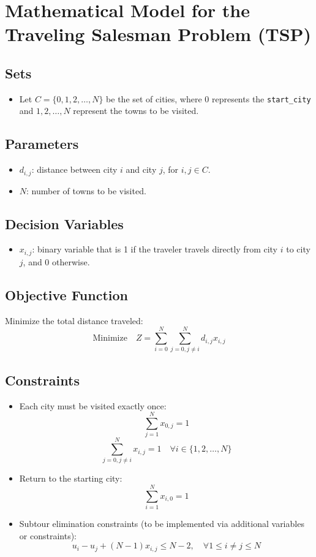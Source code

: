 \documentclass{article}
\begin{document}
\section*{Mathematical Model for the Traveling Salesman Problem (TSP)}

\subsection*{Sets}
\begin{itemize}
    \item Let \( C = \{0, 1, 2, \ldots, N\} \) be the set of cities, where \( 0 \) represents the \texttt{start\_city} and \( 1, 2, \ldots, N \) represent the towns to be visited.
\end{itemize}

\subsection*{Parameters}
\begin{itemize}
    \item \( d_{i,j} \): distance between city \( i \) and city \( j \), for \( i, j \in C \).
    \item \( N \): number of towns to be visited.
\end{itemize}

\subsection*{Decision Variables}
\begin{itemize}
    \item \( x_{i,j} \): binary variable that is 1 if the traveler travels directly from city \( i \) to city \( j \), and 0 otherwise.
\end{itemize}

\subsection*{Objective Function}
Minimize the total distance traveled:
\[
\text{Minimize} \quad Z = \sum_{i=0}^{N} \sum_{j=0, j \neq i}^{N} d_{i,j} x_{i,j}
\]

\subsection*{Constraints}
\begin{itemize}
    \item Each city must be visited exactly once:
    \[
    \sum_{j=1}^{N} x_{0,j} = 1
    \]
    \[
    \sum_{j=0, j \neq i}^{N} x_{i,j} = 1 \quad \forall i \in \{1, 2, \ldots, N\}
    \]
    
    \item Return to the starting city:
    \[
    \sum_{i=1}^{N} x_{i,0} = 1
    \]
    
    \item Subtour elimination constraints (to be implemented via additional variables or constraints):
    \[
    u_i - u_j + (N-1) x_{i,j} \leq N-2, \quad \forall 1 \leq i \neq j \leq N
    \]
\end{itemize}
\end{document}
